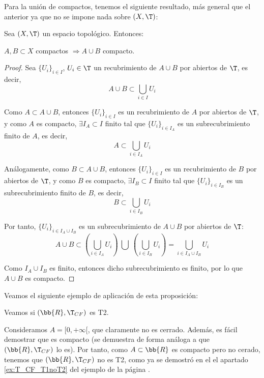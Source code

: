 Para la unión de compactos, tenemos el siguiente resultado, más general que el anterior ya que no se impone nada sobre $(X,\T)$:
\begin{prop} \label{prop:UnionCompactos}
    Sea $(X,\T)$ un espacio topológico. Entonces:
    \begin{center}
        $A,B\subset X$ compactos $\Longrightarrow A\cup B$ compacto.
    \end{center}
\end{prop}
\begin{proof}
    Sea $\{U_i\}_{i\in I}$, $U_i\in \T$ un recubrimiento de $A\cup B$ por abiertos de $\T$, es decir,
    \begin{equation*}
        A\cup B \subset \bigcup_{i\in I}U_i
    \end{equation*}

    Como $A\subset A\cup B$, entonces $\{U_i\}_{i\in I}$ es un recubrimiento de $A$ por abiertos de $\T$, y como $A$ es compacto, $\exists I_A\subset I$ finito tal que $\{U_i\}_{i\in I_A}$ es un subrecubrimiento finito de $A$,
    es decir,
    \begin{equation*}
        A \subset \bigcup_{i\in I_A}U_i
    \end{equation*}

    Análogamente, como $B\subset A\cup B$, entonces $\{U_i\}_{i\in I}$ es un recubrimiento de $B$ por abiertos de $\T$, y como $B$ es compacto, $\exists I_B\subset I$ finito tal que $\{U_i\}_{i\in I_B}$ es un subrecubrimiento finito de $B$,
    es decir,
    \begin{equation*}
        B \subset \bigcup_{i\in I_B}U_i
    \end{equation*}

    Por tanto, $\{U_i\}_{i\in I_A\cup I_B}$ es un subrecubrimiento de $A\cup B$ por abiertos de $\T$:
    \begin{equation*}
        A\cup B \subset \left(\bigcup_{i\in I_A}U_i\right) ~\bigcup~ \left(\bigcup_{i\in I_B}U_i\right) = \bigcup_{i\in I_A\cup I_B}U_i
    \end{equation*}

    Como $I_A\cup I_B$ es finito, entonces dicho subrecubrimiento es finito, por lo que $A\cup B$ es compacto.
\end{proof}


Veamos el siguiente ejemplo de aplicación de esta proposición:
\begin{ejemplo}
    Veamos si $(\bb{R},\T_{CF})$ es T2.
    
    Consideramos $A=[0,+\infty[$, que claramente no es cerrado. Además, es fácil demostrar que es compacto (se demuestra de forma análoga a que $(\bb{R},\T_{CF})$ lo es).
    Por tanto, como $A\subset \bb{R}$ es compacto pero no cerado, tenemos que $(\bb{R},\T_{CF})$ no es T2, como ya se demostró en el el apartado \ref{ex:T_CF_T1noT2} del ejemplo de la página \pageref{ex:T_CF_T1noT2}.
\end{ejemplo}


